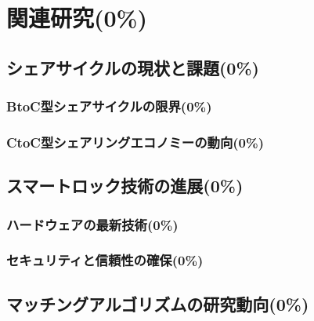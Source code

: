 \section{関連研究(0\%)}
  \label{sec:関連研究}
    \par
  
  \subsection{シェアサイクルの現状と課題(0\%)}
    \label{sec:シェアサイクルの現状と課題}
      \par
  
      \subsubsection{BtoC型シェアサイクルの限界(0\%)}
        \label{sec:BtoC型シェアサイクルの限界}
          \par
          
      \subsubsection{CtoC型シェアリングエコノミーの動向(0\%)}
        \label{sec:CtoC型シェアリングエコノミーの動向}
          \par
      
  \subsection{スマートロック技術の進展(0\%)}
    \label{sec:スマートロック技術の進展}
      \par
      
      \subsubsection{ハードウェアの最新技術(0\%)}
        \label{sec:ハードウェアの最新技術}
          \par
          
      \subsubsection{セキュリティと信頼性の確保(0\%)}
        \label{sec:セキュリティと信頼性の確保}
          \par  
  
  \subsection{マッチングアルゴリズムの研究動向(0\%)}
    \label{sec:マッチングアルゴリズムの研究動向}
      \par 
      
